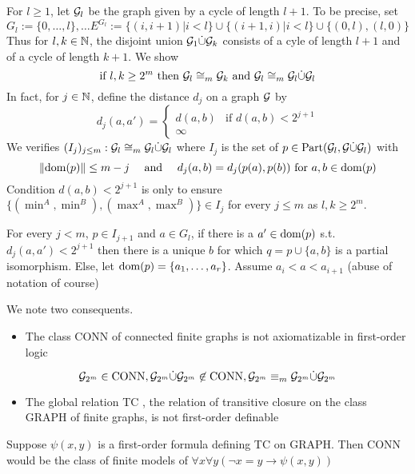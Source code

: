 \documentclass[11pt]{article}
\def \Part {\text{Part}}
\begin{document}
\begin{examplle}[]
For \(l\ge1\), let \(\mathcal{G}_l\) be the graph given by a cycle of length \(l+1\). To be precise,
set
\begin{equation*}
G_l:=\{0,\dots,l\},\dots
E^{G_l}:=\{(i,i+1)|i<l\}\cup\{(i+1,i)|i<l\}\cup\{(0,l),(l,0)\}
\end{equation*}
Thus for \(l,k\in\mathbb{N}\), the disjoint union \(\mathcal{G}_1\dot\cup\mathcal{G}_k\) consists of a cyle of length
\(l+1\) and of a cycle of length \(k+1\). We show
\begin{equation*}
\text{if }l,k\ge2^m\text{ then }\mathcal{G}_l\cong_m\mathcal{G}_k\text{ and }\mathcal{G}_l\cong_m
\mathcal{G}_l\dot\cup\mathcal{G}_l
\end{equation*}
In fact, for \(j\in\mathbb{N}\), define the distance \(d_j\) on a graph \(\mathcal{G}\) by
\begin{equation*}
d_j(a,a')=
\begin{cases}
d(a,b)&\text{if }d(a,b)<2^{j+1}\\
\infty
\end{cases}
\end{equation*}
We verifies \((I_j)_{j\le m}:\mathcal{G}_l\cong_m\mathcal{G}_l\dot\cup\mathcal{G}_l\) where
\(I_j\) is the set of \(p\in\Part(\calg_l,\calg\dot\cup\calg_l)\) with
\begin{equation*}
\left\lVert\operatorname{dom}(p)\right\rVert\le m-j \quad\text{ and }\quad
d_j(a,b)=d_j(p(a),p(b))\text{ for }a,b\in\operatorname{dom}(p)
\end{equation*}
Condition \(d(a,b)<2^{j+1}\) is only to ensure \(\{(\min^A,\min^B),(\max^A,\max^B)\}\in I_j\) for
every \(j\le m\) as \(l,k\ge 2^m\). 

For every \(j<m\), \(p\in I_{j+1}\) and \(a\in G_l\), if there is a \(a'\in\operatorname{dom}(p)\)
s.t. \(d_j(a,a')<2^{j+1}\) then there is a unique \(b\) for which \(q=p\cup\{a,b\}\) is a partial
isomorphism. Else, let \(\operatorname{dom}(p)=\{a_1,\dots,a_r\}\). Assume \(a_i<a<a_{i+1}\) (abuse of notation
of course)




We note two consequents.
\begin{itemize}
\item The class CONN of connected finite graphs is not axiomatizable in first-order logic
\end{itemize}


   \begin{equation*}
\mathcal{G}_{2^m}\in\text{CONN}, \mathcal{G}_{2^m}\dot\cup\mathcal{G}_{2^m}\not\in\text{CONN},
\mathcal{G}_{2^m}\equiv_m\mathcal{G}_{2^m}\dot\cup\mathcal{G}_{2^m}
   \end{equation*}

\begin{itemize}
\item The global relation TC , the relation of transitive closure on the class GRAPH of finite
graphs, is not first-order definable
\end{itemize}


Suppose \(\psi(x,y)\) is a first-order formula defining TC on GRAPH. Then CONN would be the class of
finite models of \(\forall x \forall y(\neg x=y \to \psi(x,y))\)
\end{examplle}
\end{document}
